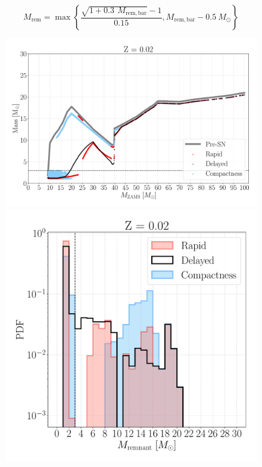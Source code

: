 \documentclass[a4paper,titlepage]{book}     	%
\newcommand{\sun}{\ensuremath{_\odot}}
\newcommand{\msun}{\ensuremath{M\sun}}
\begin{document}
\begin{equation}\label{eq:neutrinolosses}
    M_\mathrm{rem} = \max \left\{ \frac{\sqrt{1 + 0.3\,~M_\mathrm{rem, bar}} -1 }{0.15}, M_\mathrm{rem,bar}-0.5~\msun\right\}
\end{equation}




\begin{figure}[t!]
	\begin{minipage}{.60\textwidth}
		\centering
		\includegraphics[width=1.05\textwidth]{./images/remnants_Z02.pdf}
	\end{minipage}
	\hfill
	\begin{minipage}{.39\textwidth}
		\centering
		\includegraphics[width=1.05\textwidth]{./images/hist_Z02.pdf}	

\end{minipage}
\end{figure}
\end{document}
